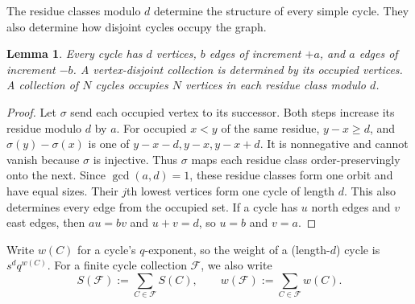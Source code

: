 \documentclass[12pt,reqno]{amsart}
\numberwithin{equation}{section}
\newtheorem{lemma}[theorem]{Lemma}
\theoremstyle{definition}
\theoremstyle{remark}
\theoremstyle{plain}
\begin{document}
The residue classes modulo $d$ determine the structure of every simple
cycle.  They also determine how disjoint cycles occupy the graph.

\begin{lemma}\label{lem:cyclelength}
Every cycle has $d$ vertices, $b$ edges of increment $+a$, and $a$
edges of increment $-b$.
A vertex-disjoint collection is determined by its occupied vertices.
A collection of $N$ cycles occupies $N$ vertices in each residue
class modulo $d$.
\end{lemma}
\begin{proof}
Let $\sigma$ send each occupied vertex to its successor.
Both steps increase its residue modulo $d$ by $a$.
For occupied $x<y$ of the same residue, $y-x\ge d$, and
$\sigma(y)-\sigma(x)$ is one of $y-x-d,y-x,y-x+d$.
It is nonnegative and cannot vanish because $\sigma$ is injective.
Thus $\sigma$ maps each residue class order-preservingly onto the next.
Since $\gcd(a,d)=1$, these residue classes form one orbit and have
equal sizes.  Their $j$th lowest vertices form one cycle of length
$d$.  This also determines every edge from the occupied set.
If a cycle has $u$ north edges and $v$ east edges, then
$au=bv$ and $u+v=d$, so $u=b$ and $v=a$.
\end{proof}

Write $w(C)$ for a cycle's $q$-exponent, so the weight of a (length-$d$) cycle is $s^d q^{w(C)}$.
For a finite cycle collection $\mathcal F$, we also write
\[
 S(\mathcal F):=\sum_{C\in\mathcal F}S(C),\qquad
 w(\mathcal F):=\sum_{C\in\mathcal F}w(C).
\]
\end{document}
